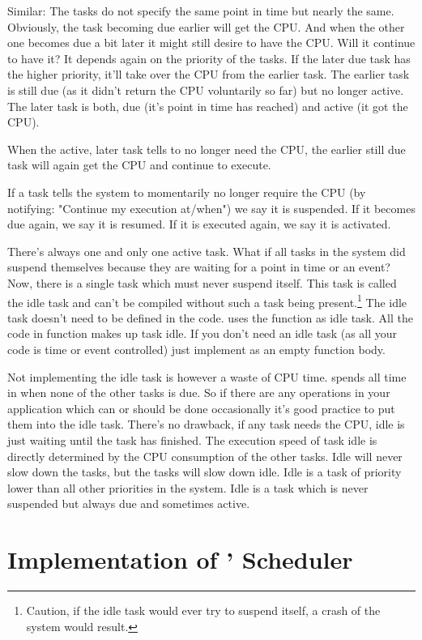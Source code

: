 Similar: The tasks do not specify the same point in time but nearly the
same. Obviously, the task becoming due earlier will get the CPU. And when
the other one becomes due a bit later it might still desire to have the
CPU. Will it continue to have it? It depends again on the priority of the
tasks. If the later due task has the higher priority, it'll take over the
CPU from the earlier task. The earlier task is still due (as it didn't
return the CPU voluntarily so far) but no longer active. The later task is
both, due (it's point in time has reached) and active (it got the CPU).

When the active, later task tells \rtos{} to no longer need the CPU, the
earlier still due task will again get the CPU and continue to execute.

If a task tells the system to momentarily no longer require the CPU (by
notifying: "Continue my execution at/when") we say it is suspended. If it
becomes due again, we say it is resumed. If it is executed again, we say
it is activated.

There's always one and only one active task. What if all tasks in the
system did suspend themselves because they are waiting for a point in time
or an event? Now, there is a single task which must never suspend itself.
This task is called the idle task and \rtos{} can't be compiled without
such a task being present.\footnote{Caution, if the idle task would ever
try to suspend itself, a crash of the system would result.} The idle task
doesn't need to be defined in the code. \rtos{} uses the function
 as idle task. All the code in function  makes up
task idle. If you don't need an idle task (as all your code is time or
event controlled) just implement  as an empty function body.

Not implementing the idle task is however a waste of CPU time. \rtos{} spends
all time in  when none of the other tasks is due. So if there
are any operations in your application which can or should be done
occasionally it's good practice to put them into the idle task. There's no
drawback, if any task needs the CPU, idle is just waiting until the task
has finished. The execution speed of task idle is directly determined by
the CPU consumption of the other tasks. Idle will never slow down the
tasks, but the tasks will slow down idle. Idle is a task of priority lower
than all other priorities in the system. Idle is a task which is never
suspended but always due and sometimes active.


\section{Implementation of \rtos' Scheduler}
\label{secScheduler}

